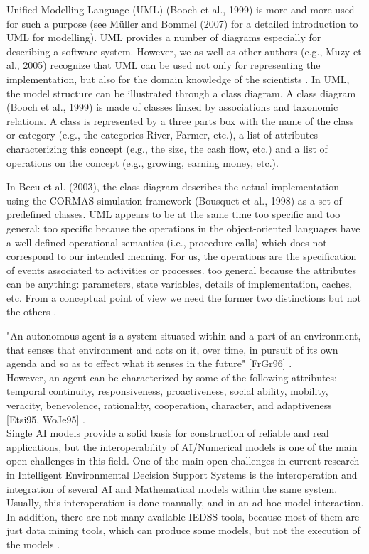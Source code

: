 \documentclass[letterpaper, 10 pt, conference]{ieeeconf}  %
\begin{document}
Uniﬁed Modelling Language (UML) (Booch et al., 1999) is more and more used for such a purpose (see Müller and Bommel (2007) for a detailed introduction to UML for modelling). UML provides a number of diagrams especially for describing a software system. However, we as well as other authors (e.g., Muzy et al., 2005) recognize that UML can be used not only for representing the implementation, but also for the domain knowledge of the scientists \cite{Farolfi2010}.
In UML, the model structure can be illustrated through a class diagram. A class diagram (Booch et al., 1999) is made of classes linked by associations and taxonomic relations. A class is represented by a three parts box with the name of the class or category (e.g., the categories River, Farmer, etc.), a list of attributes characterizing this concept (e.g., the size, the cash ﬂow, etc.) and a list of operations on the concept (e.g., growing, earning money, etc.)\cite{Farolfi2010}.

In Becu et al. (2003), the class diagram describes the actual implementation using the CORMAS simulation framework (Bousquet et al., 1998) as a set of predeﬁned classes. UML appears to be at the same time too speciﬁc and too general: too speciﬁc because the operations in the object-oriented languages have a well deﬁned operational semantics (i.e., procedure calls) which does not correspond to our intended meaning. For us, the operations are the speciﬁcation of events associated to activities or processes. too general because the attributes can be anything: parameters, state variables, details of implementation, caches, etc. From a conceptual point of view we need the former two distinctions but not the others \cite{Farolfi2010}.

"An autonomous agent is a system situated within and a part of an environment, that senses that environment and acts on it, over time, in pursuit of its own agenda and so as to effect what it senses in the future" [FrGr96]  \cite{Athanasiadis2005}.\\

However, an agent can be characterized by some of the following attributes: temporal continuity, responsiveness, proactiveness, social ability, mobility, veracity, benevolence, rationality, cooperation, character, and adaptiveness [Etsi95, WoJe95] \cite{Athanasiadis2005}.\\

Single AI models provide a solid basis for construction of reliable and real applications, but the interoperability of AI/Numerical models is one of the main open challenges in this field. One of the main open challenges in current research in Intelligent Environmental Decision Support Systems is the interoperation and integration of several AI and Mathematical models within the same system. Usually, this interoperation is done manually, and in an ad hoc model interaction. In addition, there are not many available IEDSS tools, because most of them are just data mining tools, which can produce some models, but not the execution of the models  \cite{S`anchez-Marr`e2014}.\\
\end{document}
